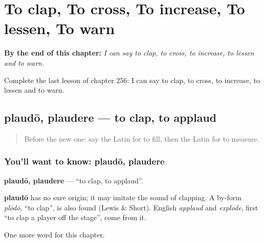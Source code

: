 
\chapter{To clap, To cross, To increase, To lessen, To warn}
\label{ch:la-to-clap-to-cross-to-increase-to-lessen-to-warn}

\begin{chapteropening}
\textbf{By the end of this chapter:} \emph{I can say to clap, to cross, to increase, to lessen and to warn.}

Complete the last lesson of chapter 256: I can say to clap, to cross, to increase, to lessen and to warn.
\end{chapteropening}

\section[plaudō, plaudere]{plaudō, plaudere — to clap, to applaud}

\label{lesson:LA-C256-plaudo}



\begin{quote}
Before the new one: say the Latin for to fill, then the Latin for to measure.
\end{quote}

\subsection*{You'll want to know: plaudō, plaudere}
\textbf{plaudō, plaudere} — \textquotedblleft{}to clap, to applaud\textquotedblright{}.

\begin{cousinweb}
\textbf{plaudō} has no sure origin; it may imitate the sound of clapping. A by-form \emph{plōdō}, \textquotedblleft{}to clap\textquotedblright{}, is also found (Lewis \& Short). English \emph{applaud} and \emph{explode}, first \textquotedblleft{}to clap a player off the stage\textquotedblright{}, come from it.
\end{cousinweb}

\begin{grammarlens}[title={What you've built}]
One more word for this chapter.
\end{grammarlens}

